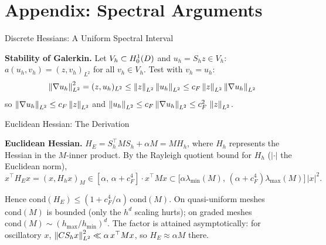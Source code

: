 \documentclass[main.tex]{subfiles}
\begin{document}
\section{Appendix: Spectral Arguments}

\begin{frame}[label=spectral]{Discrete Hessians: A Uniform Spectral Interval}
  \begin{hlbox}
    \textbf{Stability of Galerkin.} Let $V_h \subset H^1_0(D)$ and $u_h = S_h z \in V_h$: \; $a(u_h, v_h) = (z, v_h)_{L^2}$ for all $v_h \in V_h$. Test with $v_h = u_h$:
    \[
      \left\lVert \nabla u_h \right\rVert_{L^2}^2 = (z, u_h)_{L^2} \le \left\lVert z \right\rVert_{L^2}\left\lVert u_h \right\rVert_{L^2} \le c_F\left\lVert z \right\rVert_{L^2}\left\lVert \nabla u_h \right\rVert_{L^2}
    \]
    so $\left\lVert \nabla u_h \right\rVert_{L^2} \le c_F\left\lVert z \right\rVert_{L^2}$ and $\left\lVert u_h \right\rVert_{L^2} \le c_F\left\lVert \nabla u_h \right\rVert_{L^2} \le c_F^2\,\left\lVert z \right\rVert_{L^2}$.
  \end{hlbox}


  \vfill\hfill\hyperlink{disch<3>}{}
\end{frame}

\begin{frame}[label=euclidapp]{Euclidean Hessian: The Derivation}
  \begin{hlbox}
    \textbf{Euclidean Hessian.} $H_E = S_h^\top M S_h + \alpha M = M H_h$, where $H_h$ represents the Hessian in the $M$-inner product. By the Rayleigh quotient bound for $H_h$ ($|\cdot|$ the Euclidean norm),
    \[
      x^\top H_E x = (x, H_h x)_M \in [\alpha,\, \alpha + c_F^4]\cdot x^\top M x \subset \big[\alpha\lambda_{\min}(M),\, (\alpha + c_F^4)\lambda_{\max}(M)\big]\,|x|^2 .
    \]
  \end{hlbox}

  \begin{hlbox}
    Hence $\mathrm{cond}(H_E) \le (1 + c_F^4/\alpha)\,\mathrm{cond}(M)$. On quasi-uniform meshes $\mathrm{cond}(M)$ is bounded (only the $h^d$ scaling hurts); on graded meshes $\mathrm{cond}(M) \sim (h_{\max}/h_{\min})^d$. The factor is attained asymptotically: for oscillatory $x$, $\left\lVert CS_h x \right\rVert_{L^2}^2 \ll \alpha\, x^\top M x$, so $H_E \approx \alpha M$ there.
  \end{hlbox}
  \vfill\hfill\hyperlink{disch<3>}{}
\end{frame}
\end{document}
